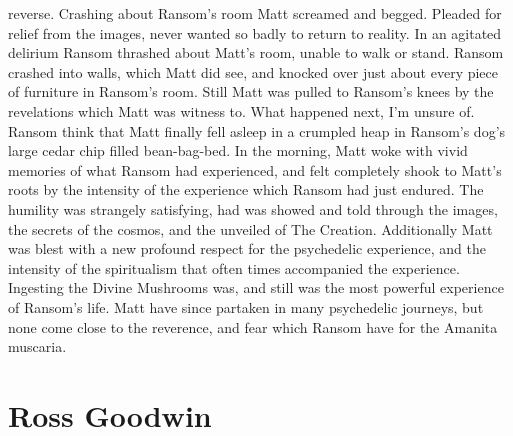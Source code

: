 \documentclass[12pt]{book}
\begin{document}
reverse. Crashing about Ransom's room Matt screamed and begged. Pleaded for relief from the images, never wanted so badly to return to reality. In an agitated delirium Ransom thrashed about Matt's room, unable to walk or stand. Ransom crashed into walls, which Matt did see, and knocked over just about every piece of furniture in Ransom's room. Still Matt was pulled to Ransom's knees by the revelations which Matt was  witness to. What happened next, I'm unsure of. Ransom think that Matt finally fell asleep in a crumpled heap in Ransom's dog's large cedar chip filled bean-bag-bed. In the morning, Matt woke with vivid memories of what Ransom had experienced, and felt completely shook to Matt's roots by the intensity of the experience which Ransom had just endured. The humility was strangely satisfying, had was showed and told through the images, the secrets of the cosmos, and the unveiled of The Creation. Additionally Matt was blest with a new profound respect for the psychedelic experience, and the intensity of the spiritualism that often times accompanied the experience. Ingesting the Divine Mushrooms was, and still was the most powerful experience of Ransom's life. Matt have since partaken in many psychedelic journeys, but none come close to the reverence, and fear which Ransom have for the Amanita muscaria.



\chapter{Ross Goodwin}
\end{document}

